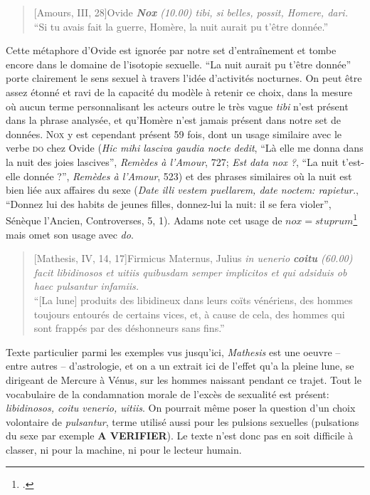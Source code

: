 \begin{quote}[Amours, III, 28]{Ovide}
    \textit{\textbf{Nox} (10.00) tibi, si belles, possit, Homere, dari.} \\
    \enquote{Si tu avais fait la guerre, Homère, la nuit aurait pu t'être donnée.}
\end{quote}

Cette métaphore d'Ovide est ignorée par notre set d'entraînement et tombe encore dans le domaine de l'isotopie sexuelle. ``La nuit aurait pu t'être donnée'' porte clairement le sens sexuel à travers l'idée d'activités nocturnes. On peut être assez étonné et ravi de la capacité du modèle à retenir ce choix, dans la mesure où aucun terme personnalisant les acteurs outre le très vague \textit{tibi} n'est présent dans la phrase analysée, et qu'Homère n'est jamais présent dans notre set de données. \textsc{Nox} y est cependant présent 59 fois, dont un usage similaire avec le verbe \textsc{do} chez Ovide (\textit{Hic mihi lasciva gaudia nocte dedit}, ``Là elle me donna dans la nuit des joies lascives'', \textit{Remèdes à l'Amour}, 727; \textit{Est data nox ?}, ``La nuit t'est-elle donnée ?'', \textit{Remèdes à l'Amour}, 523) et des phrases similaires où la nuit est bien liée aux affaires du sexe (\textit{Date illi vestem puellarem, date noctem: rapietur.}, ``Donnez lui des habits de jeunes filles, donnez-lui la nuit: il se fera violer'', Sénèque l'Ancien, Controverses, 5, 1). Adams note cet usage de $nox=stuprum$\footcite[p.178]{adams} mais omet son usage avec \textit{do}.

\begin{quote}[Mathesis, IV, 14, 17]{Firmicus Maternus, Julius}
    \textit{in uenerio \textbf{coitu} (60.00) facit libidinosos et uitiis quibusdam semper implicitos et qui adsiduis ob haec pulsantur infamiis.} \\
    \enquote{[La lune] produits des libidineux dans leurs coïts vénériens, des hommes toujours entourés de certains vices, et, à cause de cela, des hommes qui sont frappés par des déshonneurs sans fins.}
\end{quote}

Texte particulier parmi les exemples vus jusqu'ici, \textit{Mathesis} est une oeuvre -- entre autres -- d'astrologie, et on a un extrait ici de l'effet qu'a la pleine lune, se dirigeant de Mercure à Vénus, sur les hommes naissant pendant ce trajet. Tout le vocabulaire de la condamnation morale de l'excès de sexualité est présent: \textit{libidinosos, coitu venerio, uitiis}. On pourrait même poser la question d'un choix volontaire de \textit{pulsantur}, terme utilisé aussi pour les pulsions sexuelles (pulsations du sexe par exemple \textbf{A VERIFIER}). Le texte n'est donc pas en soit difficile à classer, ni pour la machine, ni pour le lecteur humain.

